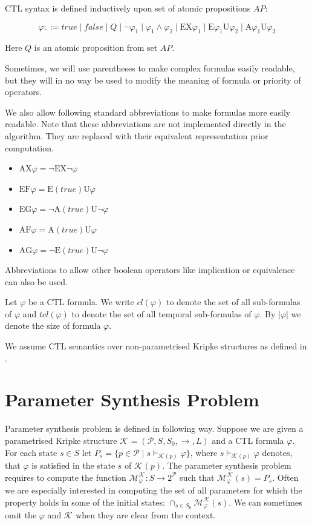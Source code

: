 \documentclass[12pt,oneside]{fithesis2}
\newcommand{\ks}[1][]{\ensuremath{\mathcal{K}_{#1}}}
\newcommand{\fullKs}{\ensuremath{ \ks = (\params, S, S_0, \trans{}, L) }}
\newcommand{\trans}[1]{\stackrel{#1}{\rightarrow}}
\newcommand{\params}{\mathcal{P}}
\newcommand{\eu}[2]{\ensuremath{\mbox{E} #1 \mbox{U} #2 }}
\newcommand{\au}[2]{\ensuremath{\mbox{A} #1 \mbox{U} #2 }}
\newcommand{\ex}[1]{\ensuremath{\mbox{EX} #1}}
\newcommand{\ax}[1]{\ensuremath{\mbox{AX} #1}}
\newcommand{\ef}[1]{\ensuremath{\mbox{EF} #1}}
\newcommand{\af}[1]{\ensuremath{\mbox{AF} #1}}
\newcommand{\eg}[1]{\ensuremath{\mbox{EG} #1}}
\newcommand{\ag}[1]{\ensuremath{\mbox{AG} #1}}
\begin{document}
			CTL syntax is defined inductively upon set of atomic propositions $AP$:
			
			\begin{equation}
				\varphi ::= 
					true \mid
					false \mid
					Q \mid 
					\neg \varphi_1 \mid 
					\varphi_1 \wedge \varphi_2 \mid
					\ex{\varphi_1} \mid
					\eu{\varphi_1}{\varphi_2} \mid
					\au{\varphi_1}{\varphi_2}			
			\end{equation}
	
			Here $Q$ is an atomic proposition from set $AP$.			
			
			Sometimes, we will use parentheses to make complex formulas easily readable, but they will in no way be used to modify the meaning of formula or priority of operators.
			
			We also allow following standard abbreviations to make formulas more easily readable. Note that these abbreviations are not implemented directly in the algorithm. They are replaced with their equivalent representation prior computation.
			
			\begin{itemize}
				\item $ \ax{\varphi} = \neg \ex{ \neg \varphi } $
				\item $ \ef{\varphi} = \eu{(true)}{\varphi} $
				\item $ \eg{\varphi} = \neg \au{(true)}{\neg \varphi} $
				\item $ \af{\varphi} = \au{(true)}{\varphi} $
				\item $ \ag{\varphi} = \neg \eu{(true)}{\neg \varphi}$
			\end{itemize}
			
			Abbreviations to allow other boolean operators like implication or equivalence can also be used. 			
			
			Let $\varphi$ be a CTL formula. We write $cl(\varphi)$ to denote the set of all sub-formulas of $\varphi$ and $tcl(\varphi)$ to denote the set of all temporal sub-formulas of $\varphi$. By $|\varphi|$ we denote the size of formula $\varphi$.
			
			We assume CTL semantics over non-parametrised Kripke structures as defined in \cite{clarke}.

		\section{Parameter Synthesis Problem}
			
			Parameter synthesis problem is defined in following way. Suppose we are given a parametrised Kripke structure $\fullKs$ and a CTL formula $\varphi$. For each state $s \in S$ let $ P_s = \{ p \in \params \mid s \models_{\ks(p)} \varphi \} $, where $s \models_{\ks(p)} \varphi$ denotes, that $\varphi$ is satisfied in the state $s$ of $\ks(p)$. The parameter synthesis problem requires to compute the function $\mathcal{M}_{\varphi}^{\ks} : S \rightarrow 2^\params $ such that $\mathcal{M}_{\varphi}^{\ks}(s) = P_s$. Often we are especially interested in computing the set of all parameters for which the property holds in some of the initial states: $\cap_{s\in S_0}\mathcal{M}_\varphi^{\mathcal K}(s)$. We can sometimes omit the $\varphi$ and $\ks$ when they are clear from the context.	
				
\end{document}
